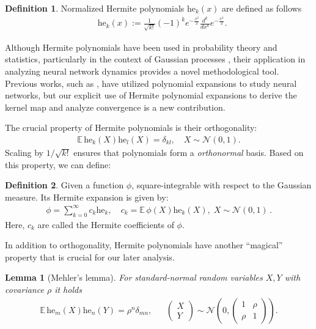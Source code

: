 \documentclass[twoside]{article}
\newcommand{\E}{\mathbb{E}\,}
\newcommand{\he}{\mathrm{he}}
\newtheorem{lemma}{Lemma}
\theoremstyle{definition}
\newtheorem{definition}{Definition}
\begin{document}
\begin{definition}
Normalized Hermite polynomials $\he_k(x)$ are defined as follows
\begin{align*}
&\he_k(x) :=\frac{1}{\sqrt{k!}}(-1)^k e^{-\frac{x^2}{2}} \frac{d^k}{dx^k} e^{-\frac{x^2}{2}}.
\end{align*}
\end{definition}

Although Hermite polynomials have been used in probability theory and statistics, particularly in the context of Gaussian processes \citep{williams2006gaussian}, their application in analyzing neural network dynamics provides a novel methodological tool. Previous works, such as \citet{daniely2016toward}, have utilized polynomial expansions to study neural networks, but our explicit use of Hermite polynomial expansions to derive the kernel map and analyze convergence is a new contribution.


The crucial property of Hermite polynomials is their  orthogonality:
\begin{align}\label{eq:hermite_orthogonality}
\E\he_k(X)\he_l(X) = \delta_{kl}, \quad X \sim \mathcal N(0,1).
\end{align}
Scaling by $1/\sqrt{k!}$ ensures that polynomials form a \emph{orthonormal} basis. Based on this property, we can define:
\begin{definition}\label{def:hermite_expansion}
Given a function $\phi$, square-integrable with respect to the Gaussian measure. Its Hermite expansion is given by:
\begin{align*}
\phi = \sum_{k=0}^\infty c_k \he_k,\quad c_k = \E\phi(X) \he_k(X), \; X \sim \mathcal N (0,1)\,.
\end{align*}
Here, $c_k$ are called the Hermite coefficients of $\phi$. 
\end{definition}


In addition to orthogonality, Hermite polynomials have another ``magical'' property that is crucial for our later analysis. 

\begin{lemma}[Mehler's lemma]\label{lem:mehler_kernel}
For standard-normal random variables $X,Y$ with covariance $\rho$ it holds
\begin{align*}
\E\he_m(X)\he_n(Y) = \rho^n \delta_{mn}, && \begin{pmatrix}
    X \\ Y
\end{pmatrix}\sim \mathcal N\left(0, \begin{pmatrix} 1 & \rho \\ \rho & 1 \end{pmatrix}
 \right).
\end{align*}
\end{lemma}
\end{document}
